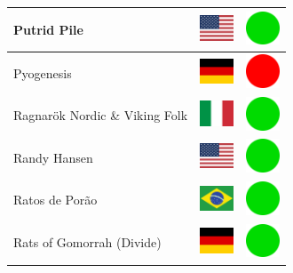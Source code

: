 \documentclass[12pt, a4paper, twoside]{report}
\begin{document}
\begin{center}
\begin{longtable}{|p{5cm}|p{2cm}|p{2cm}|}
 Putrid Pile                                                & \includegraphics[width=1cm]{../4x3/us} &   \includegraphics[width=1cm]{../likes/y} \\ \hline
 Pyogenesis                                                 & \includegraphics[width=1cm]{../4x3/de} &   \includegraphics[width=1cm]{../likes/n} \\ \hline
 Ragnarök Nordic \& Viking Folk                             & \includegraphics[width=1cm]{../4x3/it} &   \includegraphics[width=1cm]{../likes/y} \\ \hline
 Randy Hansen                                               & \includegraphics[width=1cm]{../4x3/us} &   \includegraphics[width=1cm]{../likes/y} \\ \hline
 Ratos de Porão                                             & \includegraphics[width=1cm]{../4x3/br} &   \includegraphics[width=1cm]{../likes/y} \\ \hline
 Rats of Gomorrah (Divide)                                  & \includegraphics[width=1cm]{../4x3/de} &   \includegraphics[width=1cm]{../likes/y} \\ \hline

\end{longtable}
\end{center}
\end{document}
